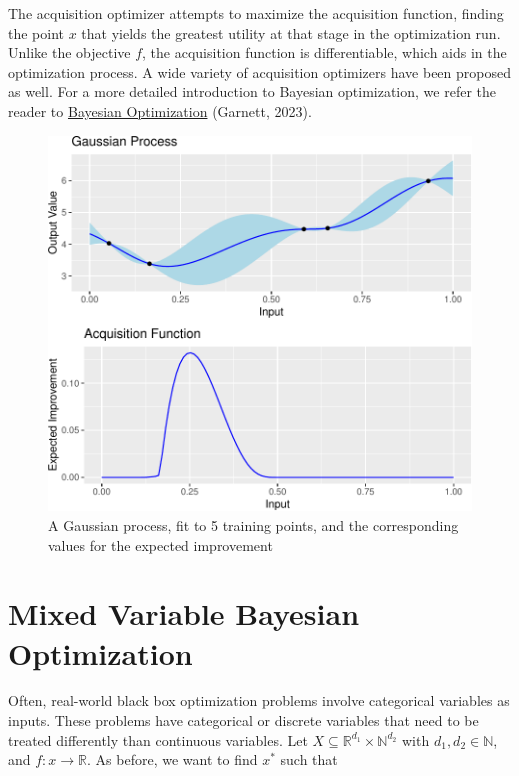 \documentclass[12pt,twoside]{reedthesis}
\begin{document}
The acquisition optimizer attempts to maximize the acquisition function, finding the point \(x\) that yields the greatest utility at that stage in the optimization run. Unlike the objective \(f\), the acquisition function is differentiable, which aids in the optimization process. A wide variety of acquisition optimizers have been proposed as well. For a more detailed introduction to Bayesian optimization, we refer the reader to \underline{Bayesian Optimization} (Garnett, 2023).
\begin{figure}
\centering
\includegraphics{thesis_files/figure-latex/example-gp-acq-1.pdf}
\caption{\label{fig:example-gp-acq}A Gaussian process, fit to 5 training points, and the corresponding values for the expected improvement}
\end{figure}
\hypertarget{mixed-variable-bayesian-optimization}{%
\section{Mixed Variable Bayesian Optimization}\label{mixed-variable-bayesian-optimization}}

Often, real-world black box optimization problems involve categorical variables as inputs. These problems have categorical or discrete variables that need to be treated differently than continuous variables. Let \(X\subseteq \mathbb{R}^{d_1}\times\mathbb{N}^{d_2}\) with \(d_1,d_2\in\mathbb{N}\), and \(f:x\to\mathbb{R}\). As before, we want to find \(x^*\) such that
\end{document}
